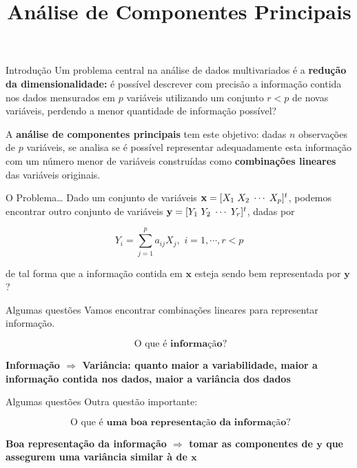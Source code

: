 \documentclass[
  ignorenonframetext,
  aspectratio=169,
]{beamer}
\title{Análise de Componentes Principais}
\author{}
\date{}
\begin{document}
\frame{\titlepage}


\begin{frame}{Introdução}
\label{introduuxe7uxe3o}
Um problema central na análise de dados multivariados é a
\textbf{redução da dimensionalidade:} é possível descrever com precisão
a informação contida nos dados mensurados em \(p\) variáveis utilizando
um conjunto \(r < p\) de novas variáveis, perdendo a menor quantidade de
informação possível?

\pause

A \textbf{análise de componentes principais} tem este objetivo: dadas
\(n\) observações de \(p\) variáveis, se analisa se é possível
representar adequadamente esta informação com um número menor de
variáveis construídas como \textbf{combinações lineares} das variáveis
originais.
\end{frame}

\begin{frame}{O Problema\ldots{}}
\label{o-problema}
Dado um conjunto de variáveis
\(\mathbf{x} = [X_1 \hspace{0.1cm} X_2 \hspace{0.1cm} \cdots \hspace{0.1cm} X_p]^t\),
podemos encontrar outro conjunto de variáveis
\(\mathbf{y} = [Y_1 \hspace{0.1cm} Y_2 \hspace{0.1cm} \cdots \hspace{0.1cm} Y_r]^t\),
dadas por

\[Y_i= \displaystyle{\sum_{j=1}^p a_{ij}X_j}, \,\, i = 1, \cdots, r < p\]

de tal forma que a informação contida em \(\mathbf{x}\) esteja sendo bem
representada por \(\mathbf{y}\)?
\end{frame}

\begin{frame}{Algumas questões}
\label{algumas-questuxf5es}
Vamos encontrar combinações lineares para representar informação.

\pause

\[🤔 \text{O que é } \textbf{informação}?\]

\pause

\textbf{Informação \(\Longrightarrow\) Variância: quanto maior a
variabilidade, maior a informação contida nos dados, maior a variância
dos dados}
\end{frame}

\begin{frame}{Algumas questões}
\label{algumas-questuxf5es-1}
Outra questão importante:

\pause

\[🤔 \text{O que é } \textbf{uma boa representação da informação}?\]

\pause

\textbf{Boa representação da informação \(\Longrightarrow\) tomar as
componentes de \(\mathbf{y}\) que assegurem uma variância similar à de
\(\mathbf{x}\)}
\end{frame}
\end{document}
